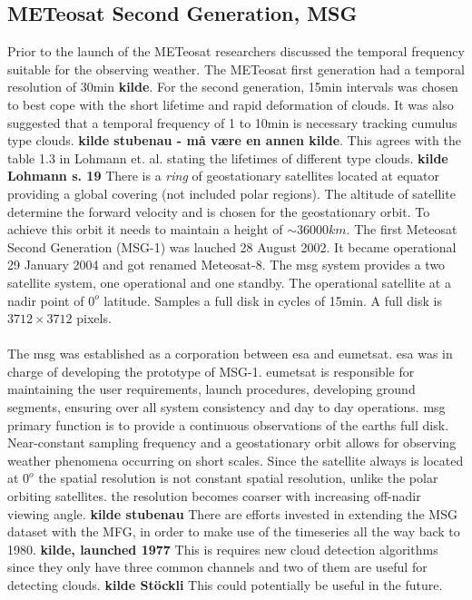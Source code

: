 \subsection{METeosat Second Generation, MSG} \label{sec:meteosat}
Prior to the launch of the METeosat researchers discussed the temporal frequency suitable for the observing weather. The METeosat first generation had a temporal resolution of 30min \textbf{kilde}. For the second generation, 15min intervals was chosen to best cope with the short lifetime and rapid deformation of clouds. It was also suggested that a temporal frequency of 1 to 10min is necessary tracking cumulus type clouds. \textbf{kilde stubenau - må være en annen kilde}. This agrees with the table 1.3 in Lohmann et. al. stating the lifetimes of different type clouds. \textbf{kilde Lohmann s. 19} There is a \textit{ring} of geostationary satellites located at equator providing a global covering (not included polar regions). The altitude of satellite determine the forward velocity and is chosen for the geostationary orbit. To achieve this orbit it needs to maintain a height of $\sim 36 000km $. The first Meteosat Second Generation (MSG-1) was lauched 28 August 2002. It became operational 29 January 2004 and got renamed Meteosat-8. The \acrshort{msg} system provides a two satellite system, one operational and one standby. The operational satellite at a nadir point of $0^o$ latitude. Samples a full disk in cycles of 15min. A full disk is $3712\times 3712$ pixels.
\\ \\ 
The \acrfull{msg} was established as a corporation between \acrfull{esa} and \acrfull{eumetsat}. \acrshort{esa} was in charge of developing the prototype of MSG-1. \acrshort{eumetsat} is responsible for maintaining the user requirements, launch procedures, developing ground segments, ensuring over all system consistency and day to day operations.  \acrshort{msg} primary function is to provide a continuous observations of the earths full disk. Near-constant sampling frequency and a geostationary orbit allows for observing weather phenomena occurring on short scales. Since the satellite always is located at $0^o$ the spatial resolution is not constant spatial resolution, unlike the polar orbiting satellites. the resolution becomes coarser with increasing off-nadir viewing angle. \textbf{kilde stubenau} There are efforts invested in extending the MSG dataset with the MFG, in order to make use of the timeseries all the way back to 1980. \textbf{kilde, launched 1977} This is requires new cloud detection algorithms since they only have three common channels and two of them are useful for detecting clouds. \textbf{kilde Stöckli} This could potentially be useful in the future. 
